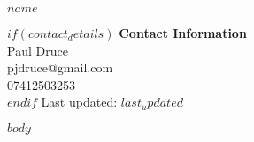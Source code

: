 \documentclass[10pt]{article}
\makeatletter
\def\name{$name$}
\newcommand{\contactinfo}[0]{
\begin{flushright}
  $if(contact_details)$
  \textcolor{sectioncolor}{\textbf{Contact Information}} \\
  Paul Druce \\
  pjdruce@gmail.com\\
  07412503253\\
  $endif$
  Last updated: $last_updated$
\end{flushright}
}
\makeatother
\begin{document}
\noindent
\begin{minipage}[t]{0.5\textwidth}
  {\huge \name}
\end{minipage}%
\begin{minipage}[t]{0.5\textwidth}
  \contactinfo{}
\end{minipage}


$body$
\end{document}
